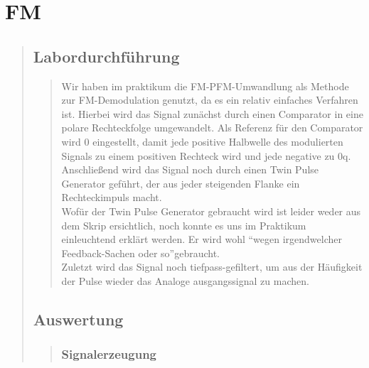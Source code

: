 \section{FM}
\begin{quote}
    
    
    \subsection{Labordurchführung}
    \begin{quote}
        Wir haben im praktikum die FM-PFM-Umwandlung als Methode zur FM-Demodulation genutzt, da es ein relativ einfaches
        Verfahren ist. Hierbei wird das Signal zunächst durch einen Comparator in eine polare Rechteckfolge umgewandelt. Als
        Referenz für den Comparator wird \si{0}{\volt} eingestellt, damit jede positive Halbwelle des modulierten Signals zu
        einem positiven Rechteck wird und jede negative zu \si{0}{\volt}q.\\
        Anschließend wird das Signal noch durch einen Twin Pulse Generator geführt, der aus jeder steigenden Flanke ein
        Rechteckimpuls macht.\\
        Wofür der Twin Pulse Generator gebraucht wird ist leider weder aus dem Skrip ersichtlich, noch konnte es uns im Praktikum
        einleuchtend erklärt werden. Er wird wohl ``wegen irgendwelcher Feedback-Sachen oder so''\footnotemark gebraucht.\\
        Zuletzt wird das Signal noch tiefpass-gefiltert, um aus der Häufigkeit der Pulse wieder das Analoge ausgangssignal zu
        machen.
        
    \end{quote}
    
    \subsection{Auswertung}
    \begin{quote}
        
        
        \subsubsection{Signalerzeugung}
        \begin{quote}
            

\end{quote}
\end{quote}
\end{quote}

